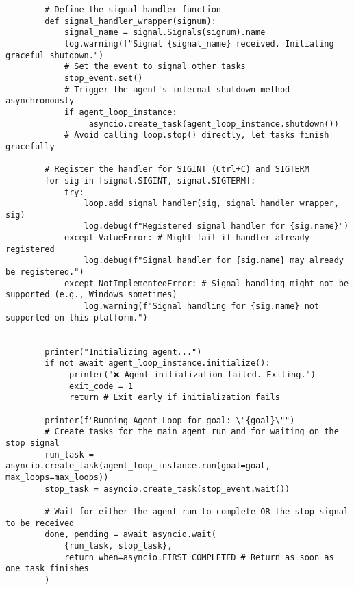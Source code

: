 \documentclass[12pt,a4paper]{article}
\begin{document}
\begin{pageablecode}
\begin{verbatim}
        # Define the signal handler function
        def signal_handler_wrapper(signum):
            signal_name = signal.Signals(signum).name
            log.warning(f"Signal {signal_name} received. Initiating graceful shutdown.")
            # Set the event to signal other tasks
            stop_event.set()
            # Trigger the agent's internal shutdown method asynchronously
            if agent_loop_instance:
                 asyncio.create_task(agent_loop_instance.shutdown())
            # Avoid calling loop.stop() directly, let tasks finish gracefully

        # Register the handler for SIGINT (Ctrl+C) and SIGTERM
        for sig in [signal.SIGINT, signal.SIGTERM]:
            try:
                loop.add_signal_handler(sig, signal_handler_wrapper, sig)
                log.debug(f"Registered signal handler for {sig.name}")
            except ValueError: # Might fail if handler already registered
                log.debug(f"Signal handler for {sig.name} may already be registered.")
            except NotImplementedError: # Signal handling might not be supported (e.g., Windows sometimes)
                log.warning(f"Signal handling for {sig.name} not supported on this platform.")


        printer("Initializing agent...")
        if not await agent_loop_instance.initialize():
             printer("❌ Agent initialization failed. Exiting.")
             exit_code = 1
             return # Exit early if initialization fails

        printer(f"Running Agent Loop for goal: \"{goal}\"")
        # Create tasks for the main agent run and for waiting on the stop signal
        run_task = asyncio.create_task(agent_loop_instance.run(goal=goal, max_loops=max_loops))
        stop_task = asyncio.create_task(stop_event.wait())

        # Wait for either the agent run to complete OR the stop signal to be received
        done, pending = await asyncio.wait(
            {run_task, stop_task},
            return_when=asyncio.FIRST_COMPLETED # Return as soon as one task finishes
        )


\end{verbatim}
\end{pageablecode}
\end{document}
